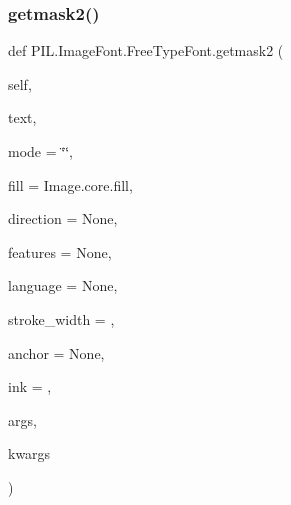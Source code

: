  \mbox{\label{classPIL_1_1ImageFont_1_1FreeTypeFont_a5fa7c7e54b3a91de58b553e9b92c8f4c}} 
\subsubsection{\texorpdfstring{getmask2()}{getmask2()}}
{\footnotesize\ttfamily def P\+I\+L.\+Image\+Font.\+Free\+Type\+Font.\+getmask2 (\begin{DoxyParamCaption}\item[{}]{self,  }\item[{}]{text,  }\item[{}]{mode = {\ttfamily \char`\"{}\char`\"{}},  }\item[{}]{fill = {\ttfamily Image.core.fill},  }\item[{}]{direction = {\ttfamily None},  }\item[{}]{features = {\ttfamily None},  }\item[{}]{language = {\ttfamily None},  }\item[{}]{stroke\+\_\+width = {},  }\item[{}]{anchor = {\ttfamily None},  }\item[{}]{ink = {},  }\item[{}]{args,  }\item[{}]{kwargs }\end{DoxyParamCaption})}


